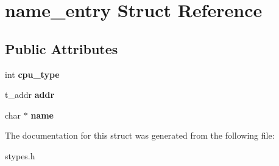 \hypertarget{structname__entry}{
\section{name\_\-entry Struct Reference}
\label{structname__entry}
}
\subsection*{Public Attributes}
\begin{DoxyCompactItemize}
\item 
\hypertarget{structname__entry_abead9150b877dbc54ebab7fa819042b1}{
int {\bfseries cpu\_\-type}}
\label{structname__entry_abead9150b877dbc54ebab7fa819042b1}

\item 
\hypertarget{structname__entry_a715ec77ecc2ba2e10811681c269a2437}{
t\_\-addr {\bfseries addr}}
\label{structname__entry_a715ec77ecc2ba2e10811681c269a2437}

\item 
\hypertarget{structname__entry_a4a70896a15e2b5f16e685903d25c247b}{
char $\ast$ {\bfseries name}}
\label{structname__entry_a4a70896a15e2b5f16e685903d25c247b}

\end{DoxyCompactItemize}


The documentation for this struct was generated from the following file:\begin{DoxyCompactItemize}
\item 
stypes.h\end{DoxyCompactItemize}
